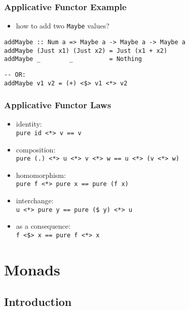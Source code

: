 \documentclass[dvipsnames]{beamer}
\theoremstyle{plain}
\begin{document}
\begin{frame}[fragile]
  \frametitle{Applicative Functor Example}

  \begin{itemize}
    \item how to add two \lstinline|Maybe| values?
  \end{itemize}

  \pause
  \medskip
  \begin{lstlisting}
addMaybe :: Num a => Maybe a -> Maybe a -> Maybe a
addMaybe (Just x1) (Just x2) = Just (x1 + x2)
addMaybe _        _          = Nothing
  \end{lstlisting}

  \pause
  \begin{lstlisting}
-- OR:
addMaybe v1 v2 = (+) <$> v1 <*> v2
  \end{lstlisting}
\end{frame}

\begin{frame}
  \frametitle{Applicative Functor Laws}

  \begin{itemize}
    \item identity:\\
      \lstinline|pure id <*> v == v|

    \medskip
    \item composition:\\
      \lstinline|pure (.) <*> u <*> v <*> w == u <*> (v <*> w)|

    \medskip
    \item homomorphism:\\
      \lstinline|pure f <*> pure x == pure (f x)|

    \medskip
    \item interchange:\\
      \lstinline|u <*> pure y == pure ($ y) <*> u|

    \pause
    \medskip
    \item as a consequence:\\
      \lstinline|f <$> x == pure f <*> x|
  \end{itemize}
\end{frame}

\section{Monads}

\subsection{Introduction}
\end{document}
